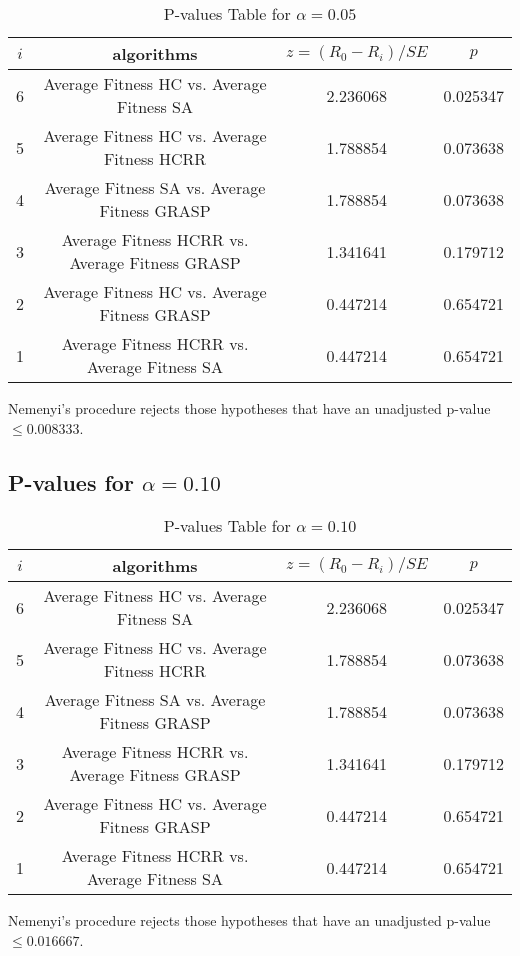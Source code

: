 \documentclass[a4paper,10pt]{article}
\begin{document}
\begin{landscape}
\begin{table}[!htp]
\centering\scriptsize
\begin{tabular}{cccc}
$i$&algorithms&$z=(R_0 - R_i)/SE$&$p$\\
\hline6&Average Fitness HC     vs. Average Fitness SA  &2.236068&0.025347\\
5&Average Fitness HC     vs. Average Fitness HCRR   &1.788854&0.073638\\
4&Average Fitness SA   vs. Average Fitness GRASP&1.788854&0.073638\\
3&Average Fitness HCRR    vs. Average Fitness GRASP&1.341641&0.179712\\
2&Average Fitness HC     vs. Average Fitness GRASP&0.447214&0.654721\\
1&Average Fitness HCRR    vs. Average Fitness SA  &0.447214&0.654721\\
\hline
\end{tabular}
\caption{P-values Table for $\alpha=0.05$}
\end{table}Nemenyi's procedure rejects those hypotheses that have an unadjusted p-value $\le0.008333$.

\pagebreak

\subsection{P-values for $\alpha=0.10$}

\begin{table}[!htp]
\centering\scriptsize
\begin{tabular}{cccc}
$i$&algorithms&$z=(R_0 - R_i)/SE$&$p$\\
\hline6&Average Fitness HC     vs. Average Fitness SA  &2.236068&0.025347\\
5&Average Fitness HC     vs. Average Fitness HCRR   &1.788854&0.073638\\
4&Average Fitness SA   vs. Average Fitness GRASP&1.788854&0.073638\\
3&Average Fitness HCRR    vs. Average Fitness GRASP&1.341641&0.179712\\
2&Average Fitness HC     vs. Average Fitness GRASP&0.447214&0.654721\\
1&Average Fitness HCRR    vs. Average Fitness SA  &0.447214&0.654721\\
\hline
\end{tabular}
\caption{P-values Table for $\alpha=0.10$}
\end{table}Nemenyi's procedure rejects those hypotheses that have an unadjusted p-value $\le0.016667$.


\end{landscape}
\end{document}
